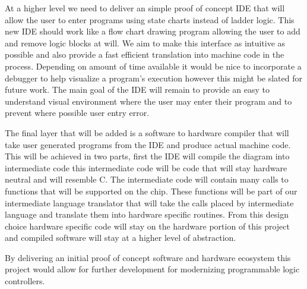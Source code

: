 At a higher level we need to deliver an simple proof of concept IDE that will allow the user to enter programs using state charts instead of ladder logic. This new IDE should work like a flow chart drawing program allowing the user to add and remove logic blocks at will. We aim to make this interface as intuitive as possible and also provide a fast efficient translation into machine code in the process. Depending on amount of time available it would be nice to incorporate a debugger to help visualize a program's execution however this might be slated for future work. The main goal of the IDE will remain to provide an easy to understand visual environment where the user may enter their program and to prevent where possible user entry error.

The final layer that will be added is a software to hardware compiler that will take user generated programs from the IDE and produce actual machine code. This will be achieved in two parts, first the IDE will compile the diagram into intermediate code this intermediate code will be code that will stay hardware neutral and will resemble C. The intermediate code will contain many calls to functions that will be supported on the chip. These functions will be part of our intermediate language translator that will take the calls placed by intermediate language and translate them into hardware specific routines. From this design choice hardware specific code will stay on the hardware portion of this project and compiled software will stay at a higher level of abstraction.

By delivering an initial proof of concept software and hardware ecosystem this project would allow for further development for modernizing programmable logic controllers.

